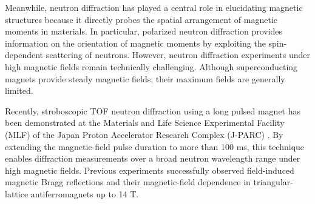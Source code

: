 \documentclass[%
 reprint,
superscriptaddress,
 amsmath,amssymb,
 aps,
floatfix,
]{revtex4-2}
\begin{document}
Meanwhile, neutron diffraction has played a central role in elucidating magnetic structures because it directly probes the spatial arrangement of magnetic moments in materials.
In particular, polarized neutron diffraction provides information on the orientation of magnetic moments by exploiting the spin-dependent scattering of neutrons.
However, neutron diffraction experiments under high magnetic fields remain technically challenging.
Although superconducting magnets provide steady magnetic fields, their maximum fields are generally limited.

Recently, stroboscopic TOF neutron diffraction using a long pulsed magnet has been demonstrated at the Materials and Life Science Experimental Facility (MLF) of the Japan Proton Accelerator Research Complex (J-PARC) \cite{nakajima_stroboscopic_2024}.
By extending the magnetic-field pulse duration to more than 100 ms, this technique enables diffraction measurements over a broad neutron wavelength range under high magnetic fields.
Previous experiments successfully observed field-induced magnetic Bragg reflections and their magnetic-field dependence in triangular-lattice antiferromagnets up to 14 T.
\end{document}
